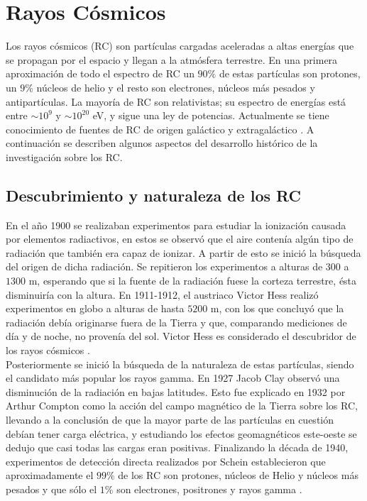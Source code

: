 \section{Rayos Cósmicos}
Los rayos cósmicos (RC) son partículas cargadas aceleradas a altas energías que se propagan por el espacio y llegan a la atmósfera terrestre. En una primera aproximaci\'on de todo el espectro de RC un $90\%$ de estas partículas son protones, un $9\%$ núcleos de helio y el resto son electrones, núcleos más pesados y antipartículas. La mayoría de RC son relativistas; su espectro de energías está entre $\sim 10^9$ y $\sim 10^{20}$ eV, y sigue una ley de potencias. Actualmente se tiene conocimiento de fuentes de RC de origen galáctico y extragaláctico \cite{Gaisser1990}. A continuación se describen algunos aspectos del desarrollo histórico de la investigación sobre los RC.
	
	\subsection{Descubrimiento y naturaleza de los RC}
	En el año 1900 se realizaban experimentos para estudiar la ionización causada por elementos radiactivos, en estos se observó que el aire contenía algún tipo de radiación que también era capaz de ionizar. A partir de esto se inició la búsqueda del origen de dicha radiación. Se repitieron los experimentos a alturas de $300$ a $1300$ m, esperando que si la fuente de la radiación fuese la corteza terrestre, ésta disminuiría con la altura. En 1911-1912, el austriaco Victor Hess realizó experimentos en globo a alturas de hasta $5200$ m, con los que concluyó que la radiación debía originarse fuera de la Tierra y que, comparando mediciones de día y de noche, no provenía del sol. Victor Hess es considerado el descubridor de los rayos cósmicos \cite{Extremas}.\\
	
	Posteriormente se inició la búsqueda de la naturaleza de estas partículas, siendo el candidato más popular los rayos gamma. En 1927 Jacob Clay observó una disminución de la radiación en bajas latitudes. Esto fue explicado en 1932 por Arthur Compton como la acción del campo magnético de la Tierra sobre los RC, llevando a la conclusión de que la mayor parte de las partículas en cuestión debían tener carga eléctrica, y estudiando los efectos geomagnéticos este-oeste se dedujo que casi todas las cargas eran positivas. Finalizando la década de 1940, experimentos de detección directa realizados por Schein establecieron que aproximadamente el $99\%$ de los RC son protones, núcleos de Helio y núcleos más pesados y que sólo el $1\%$ son electrones, positrones y rayos gamma \cite{Dorman2004}.

